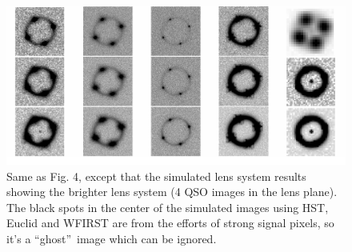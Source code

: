 \documentclass[a4paper,11pt]{article}
\begin{document}
\begin{figure}
\begin{center}
\includegraphics[width=1.0\textwidth]{brighter_system_4QSOimages_all.png}
\end{center}
\caption{Same as Fig. 4, except that the simulated lens system results showing the brighter lens system (4 QSO images in the lens plane). The black spots in the center of the simulated images using HST, Euclid and WFIRST are from the efforts of strong signal pixels, so it's a \textquotedblleft ghost\textquotedblright\ image which can be ignored.}
\label{fig:brighter_4QSOimages_montage}
\end{figure}
\end{document}
